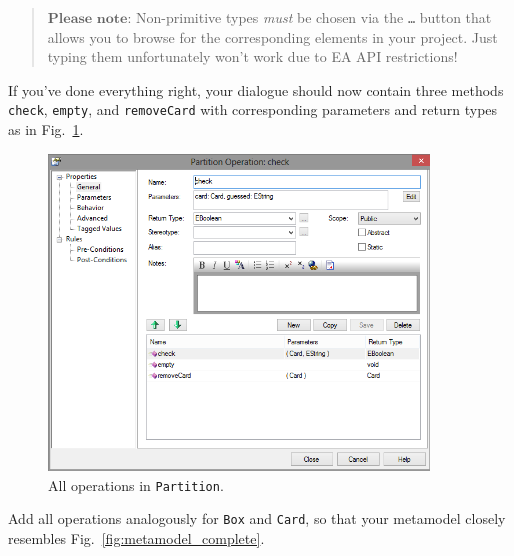 \vspace{-.5cm}
\begin{quote}
$\textbf{Please note:}$ Non-primitive types \emph{must} be chosen via the \texttt{\ldots} button that allows you to browse for the corresponding elements in your project.
Just typing them unfortunately won't work due to EA API restrictions!
\end{quote}
\vspace{-.5cm}

If you've done everything right, your dialogue should now contain three methods \texttt{check}, \texttt{empty}, and \texttt{removeCard} with corresponding parameters and return types as in Fig.~\ref{fig:operation_partition}.
\begin{figure}[htbp]
	\centering
  \includegraphics[width=0.9\textwidth]{pics/memBoxBilder/memBox39}
	\caption{All operations in \texttt{Partition}.}
	\label{fig:operation_partition}
\end{figure}

Add all operations analogously for \texttt{Box} and \texttt{Card}, so that your metamodel closely resembles Fig.~\ref{fig:metamodel_complete}.

